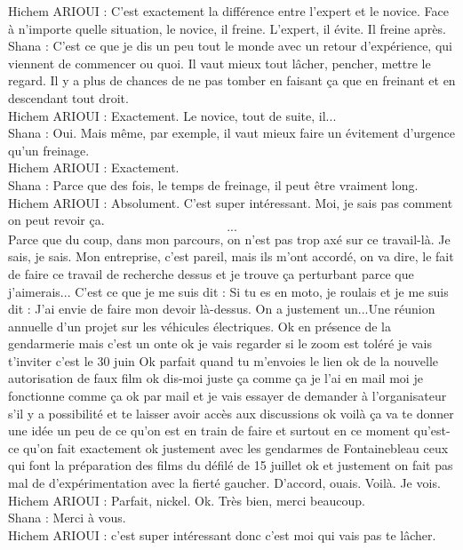 Hichem ARIOUI : C'est exactement la différence entre l'expert et le novice. Face à n'importe quelle situation, le novice, il freine. L'expert, il évite. Il freine après. \\
Shana : C'est ce que je dis un peu tout le monde avec un retour d'expérience, qui viennent de commencer ou quoi. Il vaut mieux tout lâcher, pencher, mettre le regard. Il y a plus de chances de ne pas tomber en faisant ça que en freinant et en descendant tout droit. \\
Hichem ARIOUI : Exactement. Le novice, tout de suite, il... \\
Shana : Oui. Mais même, par exemple, il vaut mieux faire un évitement d'urgence qu'un freinage. \\
Hichem ARIOUI : Exactement. \\
Shana : Parce que des fois, le temps de freinage, il peut être vraiment long. \\
Hichem ARIOUI : Absolument. C'est super intéressant. Moi, je sais pas comment on peut revoir ça. \\
\[...\]
\ifconfidentiel
Parce que du coup, dans mon parcours, on n'est pas trop axé sur ce travail-là. Je sais, je sais. Mon entreprise, c'est pareil, mais ils m'ont accordé, on va dire, le fait de faire ce travail de recherche dessus et je trouve ça perturbant parce que j'aimerais... C'est ce que je me suis dit : Si tu es en moto, je roulais et je me suis dit : J'ai envie de faire mon devoir là-dessus. 
On a justement un...Une réunion annuelle d'un projet sur les véhicules électriques. Ok en présence de la gendarmerie mais c'est un onte ok je vais regarder si le zoom est toléré je vais t'inviter c'est le 30 juin Ok parfait quand tu m'envoies le lien ok de la nouvelle autorisation de faux film ok dis-moi juste ça comme ça je l'ai en mail moi je fonctionne comme ça ok par mail et je vais essayer de demander à l'organisateur s'il y a possibilité et te laisser avoir accès aux discussions ok voilà ça va te donner une idée un peu de ce qu'on est en train de faire et surtout en ce moment qu'est-ce qu'on fait exactement ok justement avec les gendarmes de Fontainebleau ceux qui font la préparation des films du défilé de 15 juillet ok et justement on fait pas mal de d'expérimentation avec la fierté gaucher. D'accord, ouais. Voilà. Je vois. 
\fi
Hichem ARIOUI : Parfait, nickel. Ok. Très bien, merci beaucoup. \\
Shana : Merci à vous.\\
Hichem ARIOUI : c'est super intéressant donc c'est moi qui vais pas te lâcher. \\
